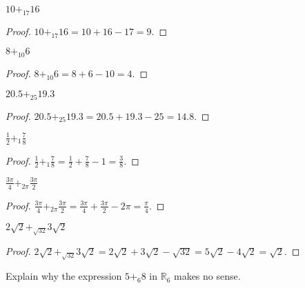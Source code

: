 \begin{exercise}
    $10 {+}_{17} 16$
\end{exercise}

\begin{proof}
    $10 {+}_{17} 16 = 10 + 16 - 17 = 9$.
\end{proof}

\begin{exercise}
    $8 {+}_{10} 6$
\end{exercise}

\begin{proof}
    $8 {+}_{10} 6 = 8 + 6 - 10 = 4$.
\end{proof}

\begin{exercise}
    $20.5 {+}_{25} 19.3$
\end{exercise}

\begin{proof}
    $20.5 {+}_{25} 19.3 = 20.5 + 19.3 - 25 = 14.8$.
\end{proof}

\begin{exercise}
    $\frac{1}{2} {+}_{1} \frac{7}{8}$
\end{exercise}

\begin{proof}
    $\frac{1}{2} {+}_{1} \frac{7}{8} = \frac{1}{2} + \frac{7}{8} - 1 = \frac{3}{8}$.
\end{proof}

\begin{exercise}
    $\frac{3\pi}{4} {+}_{2\pi} \frac{3\pi}{2}$
\end{exercise}

\begin{proof}
    $\frac{3\pi}{4} {+}_{2\pi} \frac{3\pi}{2} = \frac{3\pi}{4} + \frac{3\pi}{2} - 2\pi = \frac{\pi}{4}$.
\end{proof}

\begin{exercise}
    $2\sqrt{2} {+}_{\sqrt{32}} 3\sqrt{2}$
\end{exercise}

\begin{proof}
    $2\sqrt{2} {+}_{\sqrt{32}} 3\sqrt{2} = 2\sqrt{2} + 3\sqrt{2} - \sqrt{32} = 5\sqrt{2} - 4\sqrt{2} = \sqrt{2}$.
\end{proof}

\begin{exercise}
    Explain why the expression $5 {+}_{6} 8$ in $\mathbb{R}_{6}$ makes no sense.
\end{exercise}

